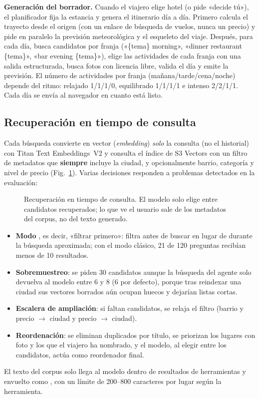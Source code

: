 \textbf{Generación del borrador.} Cuando el viajero elige hotel (o pide «decide tú»), el
planificador fija la estancia y genera el itinerario día a día. Primero calcula el trayecto desde
el origen (con un enlace de búsqueda de vuelos, nunca un precio) y pide en paralelo la previsión
meteorológica y el esqueleto del viaje. Después, para cada día, busca candidatos por franja
(«\{tema\} morning», «dinner restaurant \{tema\}», «bar evening \{tema\}»), elige las actividades
de cada franja con una salida estructurada, busca fotos con licencia libre, valida el día y emite
la previsión. El número de actividades por franja (mañana/tarde/cena/noche) depende del ritmo:
relajado 1/1/1/0, equilibrado 1/1/1/1 e intenso 2/2/1/1. Cada día se envía al navegador en cuanto
está listo.

\subsection{Recuperación en tiempo de consulta}\label{sec:recuperacion}

Cada búsqueda convierte en vector (\emph{embedding}) \emph{solo} la consulta (no el historial) con Titan Text Embeddings~V2 y
consulta el índice de S3 Vectors con un filtro de metadatos que \textbf{siempre}
incluye la ciudad, y opcionalmente barrio, categoría y nivel de precio (Fig.~\ref{fig:rag}).
Varias decisiones responden a problemas detectados en la evaluación:

\begin{figure}[t]
\centering
\resizebox{\columnwidth}{!}{}
\caption{Recuperación en tiempo de consulta. El modelo solo elige entre candidatos recuperados; lo que ve el usuario sale de los metadatos del corpus, no del texto generado.}\label{fig:rag}
\end{figure}
\begin{itemize}
  \item \textbf{Modo }, es decir, «filtrar primero»: filtra antes de buscar en lugar de durante la búsqueda
        aproximada; con el modo clásico, 21 de 120 preguntas recibían menos de 10 resultados.
  \item \textbf{Sobremuestreo}: se piden 30 candidatos aunque la búsqueda del agente solo devuelva
        al modelo entre 6 y 8 (6 por defecto), porque tras reindexar una ciudad sus vectores borrados aún ocupan
        huecos y dejarían listas cortas.
  \item \textbf{Escalera de ampliación}: si faltan candidatos, se relaja el filtro (barrio y
        precio $\rightarrow$ ciudad y precio $\rightarrow$ ciudad).
  \item \textbf{Reordenación}: se eliminan duplicados por título, se priorizan los lugares con foto
        y los que el viajero ha nombrado, y el modelo, al elegir entre los candidatos, actúa como
        reordenador final.
\end{itemize}
El texto del corpus solo llega al modelo dentro de resultados de herramientas y envuelto como
, con un límite de 200--800 caracteres por lugar según la
herramienta.

